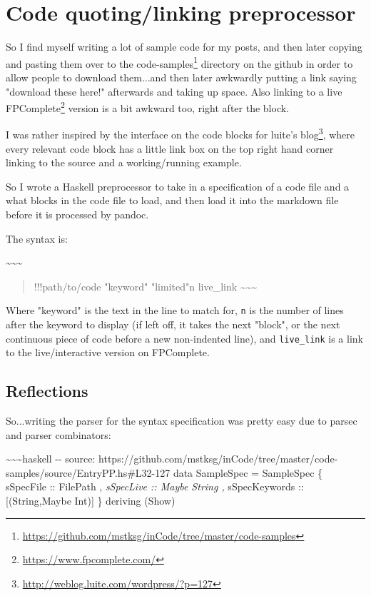 \documentclass[]{article}
\renewcommand{\href}[2]{#2\footnote{\url{#1}}}
\begin{document}
\section{Code quoting/linking preprocessor}

So I find myself writing a lot of sample code for my posts, and then later
copying and pasting them over to the
\href{https://github.com/mstksg/inCode/tree/master/code-samples}{code-samples}
directory on the github in order to allow people to download them...and then
later awkwardly putting a link saying "download these here!" afterwards and
taking up space. Also linking to a live
\href{https://www.fpcomplete.com/}{FPComplete} version is a bit awkward too,
right after the block.

I was rather inspired by the interface on the code blocks for
\href{http://weblog.luite.com/wordpress/?p=127}{luite's blog}, where every
relevant code block has a little link box on the top right hand corner linking
to the source and a working/running example.

So I wrote a Haskell preprocessor to take in a specification of a code file and
a what blocks in the code file to load, and then load it into the markdown file
before it is processed by pandoc.

The syntax is:

\textasciitilde{}\textasciitilde{}\textasciitilde{}

\begin{quote}
!!!path/to/code "keyword" "limited"n live\_link
\textasciitilde{}\textasciitilde{}\textasciitilde{}
\end{quote}

Where "keyword" is the text in the line to match for, \texttt{n} is the number
of lines after the keyword to display (if left off, it takes the next "block",
or the next continuous piece of code before a new non-indented line), and
\texttt{live\_link} is a link to the live/interactive version on FPComplete.

\subsection{Reflections}

So...writing the parser for the syntax specification was pretty easy due to
parsec and parser combinators:

\textasciitilde{}\textasciitilde{}\textasciitilde{}haskell -\/- source:
https://github.com/mstksg/inCode/tree/master/code-samples/source/EntryPP.hs\#L32-127
data SampleSpec = SampleSpec \{ sSpecFile :: FilePath , \emph{sSpecLive :: Maybe
String , }sSpecKeywords :: {[}(String,Maybe Int){]} \} deriving (Show)
\end{document}
